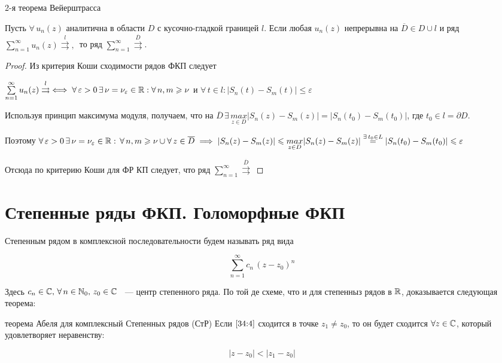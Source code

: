 \documentclass[../../main.tex]{subfiles}
\begin{document}
\begin{thm}{2-я теорема Вейерштрасса}
	\;
	
	Пусть $ \forall\, u_n(z) $ аналитична в области $ D $ с кусочно-гладкой границей $ l $. Если любая $ u_n(z) $ непрерывна на $ \overline{D} \in D \cup l $ и ряд $ \sum\limits_{n = 1}^{\infty} u_n(z) \overset{l}\rightrightarrows,\, $ то ряд $ \sum\limits_{n = 1}^{\infty} \overset{\overline{D}}\rightrightarrows $.
\end{thm}

\begin{proof}
	Из критерия Коши сходимости рядов ФКП следует
	
	$ \sum\limits_{n = 1}^{\infty} u_n(z) \overset{l}\rightrightarrows \iff \forall\, \varepsilon > 0\, \exists\, \nu = \nu_\varepsilon \in \mathbb{R} : \forall\, n, m \geqslant \nu $ и $ \forall\, t \in l : |S_n(t) - S_m(t)| \leq \varepsilon $
	
	Используя принцип максимума модуля, получаем, что на $ \overline{D}\, \exists\, \underset{z \in D}{max}|S_n(z) - S_m(z)| = |S_n(t_0) - S_m(t_0)| $, где $ t_0 \in l = \partial D $.
	
	Поэтому $ \forall\, \varepsilon > 0\, \exists\, \nu = \nu_\varepsilon \in \mathbb{R} :\, \forall\, n, m \geqslant \nu \cup \forall\, z \in \overline{D} \implies |S_n(z) - S_m(z)| \leqslant \underset{z \in D}{max}|S_n(z) - S_m(z)| \overset{\exists\, t_0 \in L}= |S_n(t_0) - S_m(t_0)| \leqslant \varepsilon $ 
	
	Отсюда по критерию Коши для ФР КП следует, что ряд $ \sum\limits_{n = 1}^{\infty} \overset{\overline{D}}\rightrightarrows $
\end{proof}

\section{Степенные ряды ФКП. Голоморфные ФКП}

Степенным рядом в комплексной последовательности будем называть ряд вида

\begin{equation}\label{34:4}
	\sum\limits_{n = 1}^{\infty} c_n\, (z - z_0)^n
\end{equation}

Здесь $ c_n \in \mathbb{C},\, \forall\, n \in \mathbb{N}_0,\, z_0 \in \mathbb{C} $ ~--- центр степенного ряда. По той де схеме, что и для степенныз рядов в $ \mathbb{R} $, доказывается следующая теорема:

\begin{thm}{теорема Абеля для комплексный Степенных рядов (СтР)}
	Если $ \eqref{34:4} $ сходится в точке $ z_1 \neq z_0 $, то он будет сходится $ \forall z \in \mathbb{C} $, который удовлетворяет неравенству:
	
	\[ |z - z_0| < |z_1 - z_0| \]
\end{thm}
\end{document}
